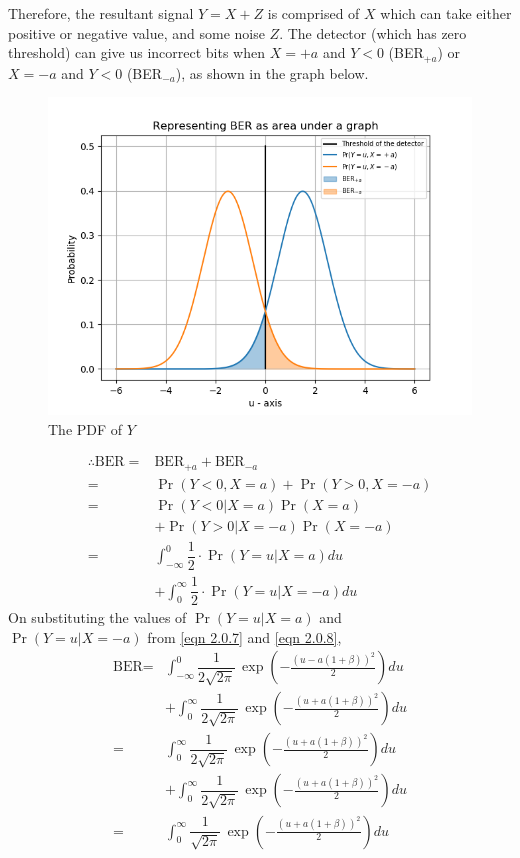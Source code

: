 \documentclass[journal,10pt,twocolumn]{IEEEtran}
\begin{document}
Therefore, the resultant signal $Y = X+Z$ is comprised of $X$ which can take either positive or negative value, and some noise $Z$. The detector (which has zero threshold) can give us incorrect bits when $X = +a$ and $Y<0$ (BER$_{+a}$) or $X=-a$ and $Y<0$ (BER$_{-a}$), as shown in the graph below.
~\\[-2em]
\begin{figure}[!htb]
    \centering    
\includegraphics[width=\columnwidth]{./Figures/Figure_1.png}
    \caption{The PDF of $Y$}
\end{figure}
\begin{align}
\therefore \text{BER} = {}& \text{BER}_{+a} + \text{BER}_{-a}\\
= {}& \Pr(Y < 0, X = a) + \Pr(Y>0, X = -a)\\
 = {}& \Pr(Y<0 | X = a) \Pr(X=a) \nonumber \\ &+ \Pr(Y>0 | X = -a) \Pr(X=-a)\\
 = {}& \int_{- \infty} ^ 0 \dfrac{1}{2} \cdot \Pr(Y = u | X = a) du \nonumber \\
 &+ \int_{0} ^{ \infty} \dfrac{1}{2} \cdot \Pr(Y = u | X = -a) du
\end{align}
On substituting the values of $\Pr(Y=u|X=a)$ and\\
$\Pr(Y=u|X=-a)$ from \ref{eqn 2.0.7} and \ref{eqn 2.0.8}, 
\begin{align}
\text{BER} = {}& \int_{- \infty } ^ 0 \dfrac{1}{2\sqrt{2\pi}}\,\exp \left(-\frac{(u - a(1 + \beta))^2}{2} \right) du \nonumber \\
&+ \int_{0} ^ {\infty } \dfrac{1}{2\sqrt{2\pi}}\,\exp \left(-\frac{(u + a(1 + \beta))^2}{2} \right) du\\
 = {}& \int_{0} ^ {\infty } \dfrac{1}{2\sqrt{2\pi}}\,\exp \left(-\frac{(u + a(1 + \beta))^2}{2} \right) du \nonumber \\
 &+ \int_{0} ^ {\infty } \dfrac{1}{2\sqrt{2\pi}}\,\exp \left(-\frac{(u + a(1 + \beta))^2}{2} \right) du\\
 = {}& \int_{0} ^ {\infty } \dfrac{1}{\sqrt{2\pi}}\,\exp \left(-\frac{(u + a(1 + \beta))^2}{2} \right) du \label{eqn 2.0.17}
\end{align} 
\end{document}
